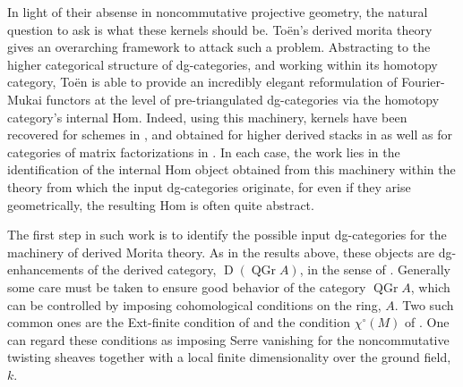 \documentclass[11pt]{article}
\begin{document}
In light of their absense in noncommutative projective geometry, the natural question to ask is what these kernels should be.
To\"en's derived morita theory \cite{Toen} gives an overarching framework to attack such a problem.
Abstracting to the higher categorical structure of dg-categories, and working within its homotopy category, To\"en is able to provide an incredibly elegant reformulation of Fourier-Mukai functors at the level of pre-triangulated dg-categories via the homotopy category's internal Hom.
Indeed, using this machinery, kernels have been recovered for schemes in \cite{Toen}, and obtained for higher derived stacks in \cite{BFN} as well as for categories of matrix factorizations in \cite{dyck,PV,BFK}.
In each case, the work lies in the identification of the internal Hom object obtained from this machinery within the theory from which the input dg-categories originate, for even if they arise geometrically, the resulting Hom is often quite abstract.


The first step in such work is to identify the possible input dg-categories for the machinery of derived Morita theory.
As in the results above, these objects are dg-enhancements of the derived category, $\operatorname{D}(\operatorname{QGr} A)$, in the sense of \cite{Lunts-Orlov}.
Generally some care must be taken to ensure good behavior of the category $\operatorname{QGr} A$, which can be controlled by imposing cohomological conditions on the ring, $A$.
Two such common ones are the Ext-finite condition of \cite{BVdB} and the condition $\chi^\circ(M)$ of \cite{AZ94}.
One can regard these conditions as imposing Serre vanishing for the noncommutative twisting sheaves together with a local finite dimensionality over the ground field, $k$.
\end{document}
